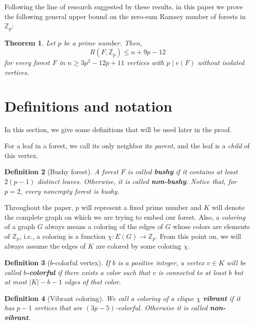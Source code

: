 \documentclass{article}
\numberwithin{table}{section}
\newtheorem{theorem}{Theorem}
\newtheorem{defin}[theorem]{Definition}
\newcommand{\Z}{\mathbb{Z}}
\begin{document}
Following the line of research suggested by these results, in this paper we prove the following general upper bound on the zero-sum Ramsey number of forests in $\mathbb{Z}_p$:

\begin{theorem}\label{thm:upperprimeforests}
    Let $p$ be a prime number. Then,
    $$R(F,\mathbb{Z}_p)\leq n+9p-12$$
    for every forest $F$ in $n\geq 3p^2-12p+11$ vertices with $p\mid e(F)$ without isolated vertices.
\end{theorem}


\section{Definitions and notation} \label{sec : prelim}


In this section, we give some definitions  that will be used later in the proof.

For a leaf in a forest, we call its only neighbor its \emph{parent}, and the leaf is a \emph{child} of this vertex. 


\begin{defin}[Bushy forest]\label{def:switching}
    A forest $F$ is called \textbf{bushy} if it contains at least $2(p-1)$ distinct leaves. Otherwise, it is called \textbf{non-bushy}. Notice that, for $p=2$, every nonempty forest is bushy.
\end{defin}


\medskip

Throughout the paper, $p$ will represent a fixed prime number and $K$ will denote the complete graph on which we are trying to embed our forest. Also, a \emph{coloring} of a graph $G$ always means a coloring of the edges of $G$ whose colors are elements of $\Z_p$, i.e., a coloring is a function ${\chi:E(G) \rightarrow \Z_p}$. From this point on, we will always assume the edges of $K$ are colored by some coloring $\chi$.
\medskip
 \begin{defin}[$b$-colorful vertex]\label{def:altc4}
    If $b$ is a positive integer, a vertex $v \in K$ will be called \textbf{$b$-colorful} if there exists a color such that $v$ is connected to at least $b$ but at most $|K|-b-1$ edges of that color.
\end{defin}


 \begin{defin}[Vibrant coloring]
     We call a coloring of a clique $\chi$ \textbf{vibrant} if it has $p-1$ vertices that are $(3p-5)$-colorful. Otherwise it is called \textbf{non-vibrant}.
 \end{defin}
\end{document}
